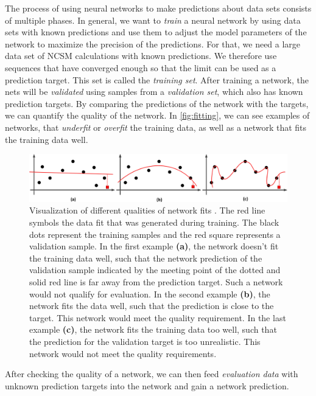 The process of using neural networks to make predictions about data sets consists of multiple phases.
In general, we want to \textit{train} a neural network by using data sets with known predictions and use them to adjust the model parameters of the network to maximize the precision of the predictions. For that, we need a large data set of NCSM calculations with known predictions. We therefore use sequences that have converged enough so that the limit can be used as a prediction target. This set is called the \textit{training set}.
After training a network, the nets will be \textit{validated} using samples from a \textit{validation set}, which also has known prediction targets. By comparing the predictions of the network with the targets, we can quantify the quality of the network. In \autoref{fig:fitting}, we can see examples of networks, that \textit{underfit} or \textit{overfit} the training data, as well as a network that fits the training data well.

\begin{figure}[H]
  \includegraphics[width=\linewidth]{media/networkquality.png}
  \caption{Visualization of different qualities of network fits \cite{underfit}. The red line symbols the data fit that was generated during training. The black dots represent the training samples and the red square represents a validation sample. In the first example \textbf{(a)}, the network doesn't fit the training data well, such that the network prediction of the validation sample indicated by the meeting point of the dotted and solid red line is far away from the prediction target. Such a network would not qualify for evaluation. In the second example \textbf{(b)}, the network fits the data well, such that the prediction is close to the target. This network would meet the quality requirement. In the last example \textbf{(c)}, the network fits the training data too well, such that the prediction for the validation target is too unrealistic. This network would not meet the quality requirements.}
  \label{fig:fitting}
\end{figure}

After checking the quality of a network, we can then feed \textit{evaluation data} with unknown prediction targets into the network and gain a network prediction.

